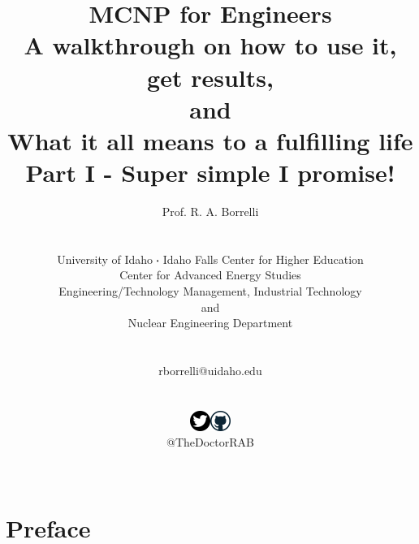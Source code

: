 \documentclass[11pt,a4paper]{article}
\newcommand*\sq{\mathbin{\vcenter{\hbox{\rule{.3ex}{.3ex}}}}} %
\begin{document}
\begin{titlepage}
    \title{
        \textbf{MCNP for Engineers}\\
        A walkthrough on how to use it, get results,\\
        and\\
        What it all means to a fulfilling life\\
        Part I - Super simple I promise!
    }
    \author{
        Prof. R. A. Borrelli
        \\ \\ \\
        University of Idaho $\sq$ Idaho Falls Center for Higher Education\\
        Center for Advanced Energy Studies\\[0.05in]
        Engineering/Technology Management, Industrial Technology\\and\\Nuclear Engineering Department
        \\ \\ \\
        rborrelli@uidaho.edu
        \\ \\ \\
        \includegraphics{twitter.png}\includegraphics{git.png}\\
        @TheDoctorRAB\\ \\
    }
\clearpage %
\maketitle
\thispagestyle{empty} %
\end{titlepage}


\section{Preface} \label{preface}
\end{document}
